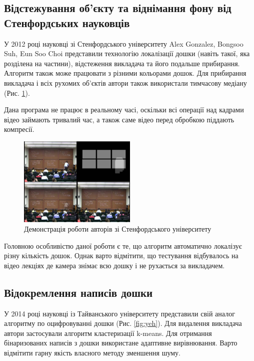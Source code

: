\subsection{Відстежування об'єкту та віднімання фону від Стенфордських науковців}

У 2012 році науковці зі Стенфордського університету Alex Gonzalez,
  Bongsoo Suh, Eun Soo Choi представили технологію \cite{suh} локалізації дошки
(навіть такої, яка розділена на частини), відстеження викладача та його
подальше прибирання. Алгоритм також може працювати з різними кольорами
дошок. Для прибирання викладача і всіх рухомих об'єктів автори також
використали тимчасову медіану (Рис. \ref{fig:suh}).

Дана програма не працює в реальному часі, оскільки всі операції над кадрами
відео займають тривалий час, а також саме відео перед обробкою
піддають компресії.

\begin{figure}[H]
  \centering
  \includegraphics[width=0.5\textwidth]{images/suh}
  \caption{Демонстрація роботи авторів зі Стенфордського університету \cite{suh}
    \label{fig:suh}
  }
\end{figure}

Головною особливістю даної роботи є те, що  алгоритм автоматично локалізує
різну кількість дошок. Однак варто відмітити, що тестування відбувалось на
відео лекціях де камера знімає всю дошку і не рухається за викладачем.

\subsection{Відокремлення написів дошки}

У 2014 році науковці із Тайванського університету представили свій аналог \cite{yeh}
алгоритму по оцифровуванні дошки (Рис. \ref{fig:yeh}). Для видалення викладача автори застосували
алгоритм кластеризації k-means. Для отримання бінаризованих написів з дошки
використане адаптивне вирівнювання. Варто відмітити гарну
якість власного методу зменшення шуму.

